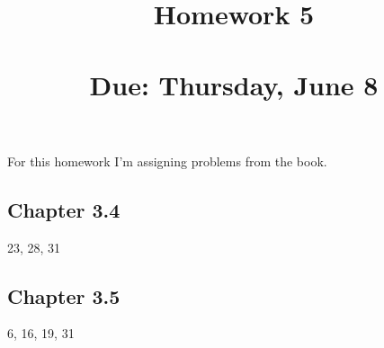 


\title{Homework 5\\ \hfill \\ Due: Thursday, June 8}


\maketitle
\thispagestyle{fancy}

For this homework I'm assigning problems from the book.

\subsection*{Chapter 3.4 }23, 28, 31

\subsection*{Chapter 3.5} 6, 16, 19, 31




